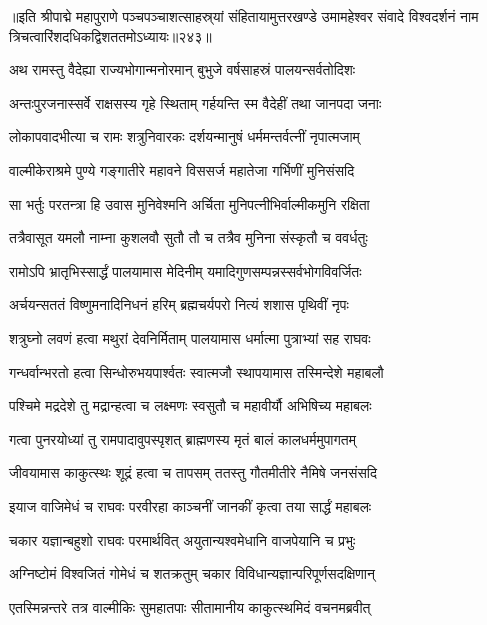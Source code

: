 ॥इति श्रीपाद्मे महापुराणे पञ्चपञ्चाशत्साहस्र्यां संहितायामुत्तरखण्डे उमामहेश्वर संवादे विश्वदर्शनं नाम त्रिचत्वारिंशदधिकद्विशततमोऽध्यायः॥२४३॥



\twolineshloka
{अथ रामस्तु वैदेह्या राज्यभोगान्मनोरमान्}
{बुभुजे वर्षसाहस्रं पालयन्सर्वतोदिशः}%

\twolineshloka
{अन्तःपुरजनास्सर्वे राक्षसस्य गृहे स्थिताम्}
{गर्हयन्ति स्म वैदेहीं तथा जानपदा जनाः}%

\twolineshloka
{लोकापवादभीत्या च रामः शत्रुनिवारकः}
{दर्शयन्मानुषं धर्ममन्तर्वत्नीं नृपात्मजाम्}%

\twolineshloka
{वाल्मीकेराश्रमे पुण्ये गङ्गातीरे महावने}
{विससर्ज महातेजा गर्भिणीं मुनिसंसदि}%

\twolineshloka
{सा भर्तुः परतन्त्रा हि उवास मुनिवेश्मनि}
{अर्चिता मुनिपत्नीभिर्वाल्मीकमुनि रक्षिता}%

\twolineshloka
{तत्रैवासूत यमलौ नाम्ना कुशलवौ सुतौ}
{तौ च तत्रैव मुनिना संस्कृतौ च ववर्धतुः}%

\twolineshloka
{रामोऽपि भ्रातृभिस्सार्द्धं पालयामास मेदिनीम्}
{यमादिगुणसम्पन्नस्सर्वभोगविवर्जितः}%

\twolineshloka
{अर्चयन्सततं विष्णुमनादिनिधनं हरिम्}
{ब्रह्मचर्यपरो नित्यं शशास पृथिवीं नृपः}%

\twolineshloka
{शत्रुघ्नो लवणं हत्वा मथुरां देवनिर्मिताम्}
{पालयामास धर्मात्मा पुत्राभ्यां सह राघवः}%

\twolineshloka
{गन्धर्वान्भरतो हत्वा सिन्धोरुभयपार्श्वतः}
{स्वात्मजौ स्थापयामास तस्मिन्देशे महाबलौ}%

\twolineshloka
{पश्चिमे मद्रदेशे तु मद्रान्हत्वा च लक्ष्मणः}
{स्वसुतौ च महावीर्यौ अभिषिच्य महाबलः}%

\twolineshloka
{गत्वा पुनरयोध्यां तु रामपादावुपस्पृशत्}
{ब्राह्मणस्य मृतं बालं कालधर्ममुपागतम्}%

\twolineshloka
{जीवयामास काकुत्स्थः शूद्रं हत्वा च तापसम्}
{ततस्तु गौतमीतीरे नैमिषे जनसंसदि}%

\twolineshloka
{इयाज वाजिमेधं च राघवः परवीरहा}
{काञ्चनीं जानकीं कृत्वा तया सार्द्धं महाबलः}%

\twolineshloka
{चकार यज्ञान्बहुशो राघवः परमार्थवित्}
{अयुतान्यश्वमेधानि वाजपेयानि च प्रभुः}%

\twolineshloka
{अग्निष्टोमं विश्वजितं गोमेधं च शतक्रतुम्}
{चकार विविधान्यज्ञान्परिपूर्णसदक्षिणान्}%

\twolineshloka
{एतस्मिन्नन्तरे तत्र वाल्मीकिः सुमहातपाः}
{सीतामानीय काकुत्स्थमिदं वचनमब्रवीत्}%

